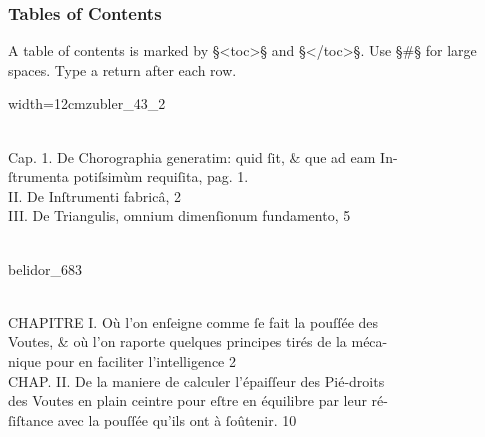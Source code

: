 \subsubsection{Tables of Contents}
\label{section tables of contents}

\begin{mainrule}
A table of contents is marked by §<toc>§ and §</toc>§. Use §#§ for large spaces. Type a return after each row.
\end{mainrule}

\begin{sampleImageSmall}[ 1]{width=12cm}{zubler_43_2}

\begin{typeLatin}
 \\
Cap. 1. \bold{#} De Chorographia generatim: quid ſit, & que ad eam In-\\
\bold{#} ſtrumenta poti{ſs}imùm requiſita, \bold{#} pag. 1. \\
II. \bold{#} De Inſtrumenti fabricâ, \bold{#} 2 \\
III. \bold{#} De Triangul{is}, omnium dimenſionum fundamento, \bold{#} 5 \\
\someText \\
\end{typeLatin}
\end{sampleImageSmall}


\begin{sampleImage}[ 2]{belidor_683}

\begin{typeLatin}
 \\
\bold{_}CHAPITRE I.\bold{_} Où l'on enſeigne comme ſe fait la pouſſée des \\
\bold{#} Voutes, & où l'on raporte quelques principes tirés de la méca- \\
\bold{#} nique pour en faciliter l'intelligence \bold{#} 2 \\
\bold{_}CHAP. II. \bold{_}De la maniere de calculer l'épaiſſeur des Pié-droits \\
\bold{#} des Voutes en plain ceintre pour eſtre en équilibre par leur ré- \\
\bold{#} ſiſtance avec la pouſſée qu'ils ont à ſoûtenir. \bold{#} 10 \\
 \\
\end{typeLatin}
\end{sampleImage}


